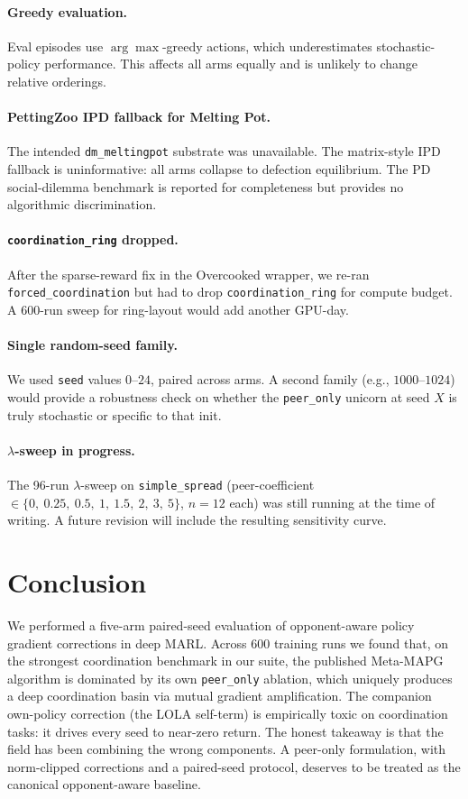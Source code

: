 \documentclass[11pt,a4paper]{article}
\newcommand{\arm}[1]{\texttt{#1}}
\begin{document}
\paragraph{Greedy evaluation.}
Eval episodes use $\arg\max$-greedy actions, which underestimates stochastic-policy performance.
This affects all arms equally and is unlikely to change relative orderings.

\paragraph{PettingZoo IPD fallback for Melting Pot.}
The intended \texttt{dm\_meltingpot} substrate was unavailable.
The matrix-style IPD fallback is uninformative: all arms collapse to defection equilibrium.
The PD social-dilemma benchmark is reported for completeness but provides no algorithmic discrimination.

\paragraph{\texttt{coordination\_ring} dropped.}
After the sparse-reward fix in the Overcooked wrapper, we re-ran \texttt{forced\_coordination} but had to drop \texttt{coordination\_ring} for compute budget.
A 600-run sweep for ring-layout would add another GPU-day.

\paragraph{Single random-seed family.}
We used \texttt{seed} values $0$--$24$, paired across arms.
A second family (e.g., $1000$--$1024$) would provide a robustness check on whether the \arm{peer\_only} unicorn at seed $X$ is truly stochastic or specific to that init.

\paragraph{$\lambda$-sweep in progress.}
The 96-run $\lambda$-sweep on \texttt{simple\_spread} (peer-coefficient $\in \{0,\ 0.25,\ 0.5,\ 1,\ 1.5,\ 2,\ 3,\ 5\}$, $n = 12$ each) was still running at the time of writing.
A future revision will include the resulting sensitivity curve.

\section{Conclusion}\label{sec:conclusion}

We performed a five-arm paired-seed evaluation of opponent-aware policy gradient corrections in deep MARL.
Across $600$ training runs we found that, on the strongest coordination benchmark in our suite,
the published Meta-MAPG algorithm is dominated by its own \arm{peer\_only} ablation,
which uniquely produces a deep coordination basin via mutual gradient amplification.
The companion own-policy correction (the LOLA self-term) is empirically toxic on coordination tasks: it drives every seed to near-zero return.
The honest takeaway is that the field has been combining the wrong components.
A peer-only formulation, with norm-clipped corrections and a paired-seed protocol, deserves to be treated as the canonical opponent-aware baseline.
\end{document}
